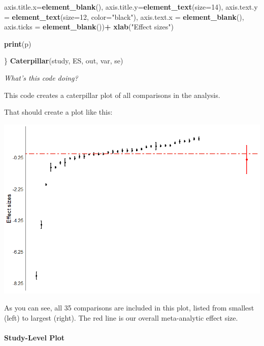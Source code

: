 \documentclass[
]{book}
\newenvironment{Shaded}{\begin{snugshade}}{\end{snugshade}}
\newcommand{\AttributeTok}[1]{\textcolor[rgb]{0.13,0.29,0.53}{#1}}
\newcommand{\DecValTok}[1]{\textcolor[rgb]{0.00,0.00,0.81}{#1}}
\newcommand{\FunctionTok}[1]{\textcolor[rgb]{0.13,0.29,0.53}{\textbf{#1}}}
\newcommand{\NormalTok}[1]{#1}
\newcommand{\SpecialCharTok}[1]{\textcolor[rgb]{0.81,0.36,0.00}{\textbf{#1}}}
\newcommand{\StringTok}[1]{\textcolor[rgb]{0.31,0.60,0.02}{#1}}
\begin{document}
\begin{Shaded}
\begin{Highlighting}[]
         \AttributeTok{axis.title.x=}\FunctionTok{element\_blank}\NormalTok{(), }\AttributeTok{axis.title.y=}\FunctionTok{element\_text}\NormalTok{(}\AttributeTok{size=}\DecValTok{14}\NormalTok{), }\AttributeTok{axis.text.y =} \FunctionTok{element\_text}\NormalTok{(}\AttributeTok{size=}\DecValTok{12}\NormalTok{, }\AttributeTok{color=}\StringTok{"black"}\NormalTok{), }\AttributeTok{axis.text.x =} \FunctionTok{element\_blank}\NormalTok{(), }\AttributeTok{axis.ticks =} \FunctionTok{element\_blank}\NormalTok{())}\SpecialCharTok{+}
  \FunctionTok{xlab}\NormalTok{(}\StringTok{"Effect sizes"}\NormalTok{)}

\FunctionTok{print}\NormalTok{(p)}

\NormalTok{\}}
\FunctionTok{Caterpillar}\NormalTok{(study, ES, out, var, se)}
\end{Highlighting}
\end{Shaded}

\emph{What's this code doing?}

This code creates a caterpillar plot of all comparisons in the analysis.

That should create a plot like this:

\includegraphics[width=1\textwidth,height=\textheight]{images/caterpillar_all.png}

As you can see, all 35 comparisons are included in this plot, listed from smallest (left) to largest (right). The red line is our overall meta-analytic effect size.

\hypertarget{study-level-plot}{%
\paragraph{Study-Level Plot}\label{study-level-plot}}
\end{document}

